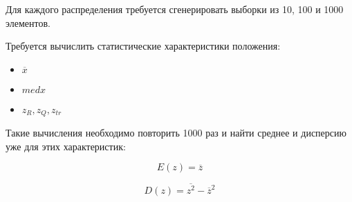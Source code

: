Для каждого распределения требуется сгенерировать выборки из 10, 100 и 1000 элементов. 

Требуется вычислить статистические характеристики положения:
\begin{itemize}
	\item $\overline{x}$
	\item $med x$
	\item $z_R, z_Q, z_{tr}$
\end{itemize}

Такие вычисления необходимо повторить 1000 раз и найти среднее и дисперсию уже для этих характеристик:

\begin{equation}\label{ez}
	E(z)=\overline{z}
\end{equation}

\begin{equation}\label{dz}
	D(z)=\overline{z^2}-\overline{z}^2
\end{equation}

